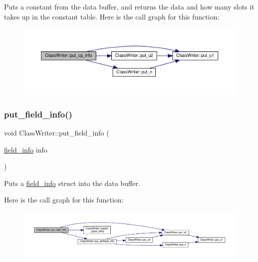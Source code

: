 Puts a constant from the data buffer, and returns the data and how many slots it takes up in the constant table. Here is the call graph for this function\+:
\nopagebreak
\begin{figure}[H]
\begin{center}
\leavevmode
\includegraphics[width=350pt]{classClassWriter_a47741e12ae2af256ce3a58a41b2d04d6_cgraph}
\end{center}
\end{figure}
\mbox{\label{classClassWriter_adfc5adcd821436ff9e399efac367c071}} 
\subsubsection{\texorpdfstring{put\+\_\+field\+\_\+info()}{put\_field\_info()}}
{\footnotesize\ttfamily void Class\+Writer\+::put\+\_\+field\+\_\+info (\begin{DoxyParamCaption}\item[{\hyperlink{structfield__info}{field\+\_\+info}}]{info }\end{DoxyParamCaption})\hspace{0.3cm}{\ttfamily [private]}}



Puts a \hyperlink{structfield__info}{field\+\_\+info} struct into the data buffer. 

Here is the call graph for this function\+:
\nopagebreak
\begin{figure}[H]
\begin{center}
\leavevmode
\includegraphics[width=350pt]{classClassWriter_adfc5adcd821436ff9e399efac367c071_cgraph}
\end{center}
\end{figure}
\mbox{\label{classClassWriter_a3221090999bef5f0e05993de89600670}} 
